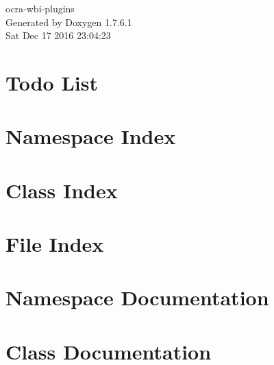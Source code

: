 \documentclass[a4paper]{book}
\begin{document}
\hypersetup{pageanchor=false,citecolor=blue}
\begin{titlepage}
\vspace*{7cm}
\begin{center}
{\Large ocra-\/wbi-\/plugins }\\
\vspace*{1cm}
{\large \-Generated by Doxygen 1.7.6.1}\\
\vspace*{0.5cm}
{\small Sat Dec 17 2016 23:04:23}\\
\end{center}
\end{titlepage}
\clearemptydoublepage
{}
\tableofcontents
\clearemptydoublepage
{}
\hypersetup{pageanchor=true,citecolor=blue}
\chapter{\-Todo \-List}
\label{todo}
\hypertarget{todo}{}

\chapter{\-Namespace \-Index}

\chapter{\-Class \-Index}

\chapter{\-File \-Index}

\chapter{\-Namespace \-Documentation}

\chapter{\-Class \-Documentation}





















\end{document}
